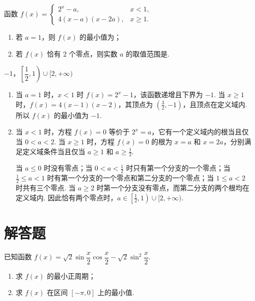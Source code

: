 \begin{problem}
函数 \(f(x)=\begin{cases}
2^x-a, & x<1,\\
4(x-a)(x-2a), & x\geqslant 1.
\end{cases}\)

\begin{enumerate}
\item 若 \(a=1\)，则 \(f(x)\) 的最小值为\fillinblank{}；
\item 若 \(f(x)\) 恰有 \(2\) 个零点，则实数 \(a\) 的取值范围是\fillinblank{}.
\end{enumerate}

\begin{answer}
\(-1\)，\(\left[\dfrac{1}{2},1\right)\cup[2,+\infty)\)
\end{answer}

\begin{solution}
\begin{enumerate}
\item 当 \(a=1\) 时，\(x<1\) 时 \(f(x)=2^x-1\)，该函数递增且下界为 \(-1\). 当 \(x\geqslant1\) 时，\(f(x)=4(x-1)(x-2)\)，其顶点为 \(\left(\frac32,-1\right)\)，且顶点在定义域内. 所以 \(f(x)\) 的最小值为 \(-1\).
\item 当 \(x<1\) 时，方程 \(f(x)=0\) 等价于 \(2^x=a\)，它有一个定义域内的根当且仅当 \(0<a<2\). 当 \(x\geqslant1\) 时，方程 \(f(x)=0\) 的根为 \(x=a\) 和 \(x=2a\)，分别满足定义域条件当且仅当 \(a\geqslant1\) 和 \(a\geqslant\frac12\).

当 \(a\leqslant0\) 时没有零点；当 \(0<a<\frac12\) 时只有第一个分支的一个零点；当 \(\frac12\leqslant a<1\) 时有第一个分支的一个零点和第二分支的一个零点；当 \(1\leqslant a<2\) 时共有三个零点. 当 \(a\geqslant2\) 时第一个分支没有零点，而第二分支的两个根均在定义域内. 因此恰有两个零点时，\(a\in\left[\frac12,1\right)\cup[2,+\infty)\).
\end{enumerate}
\end{solution}
\end{problem}

\section{解答题}

\begin{problem}
已知函数 \(f(x)=\sqrt{2}\sin\dfrac{x}{2}\cos\dfrac{x}{2}-\sqrt{2}\sin^2\dfrac{x}{2}\).

\begin{enumerate}
\item 求 \(f(x)\) 的最小正周期；
\item 求 \(f(x)\) 在区间 \(\left[-\pi,0\right]\) 上的最小值.
\end{enumerate}
\end{problem}

